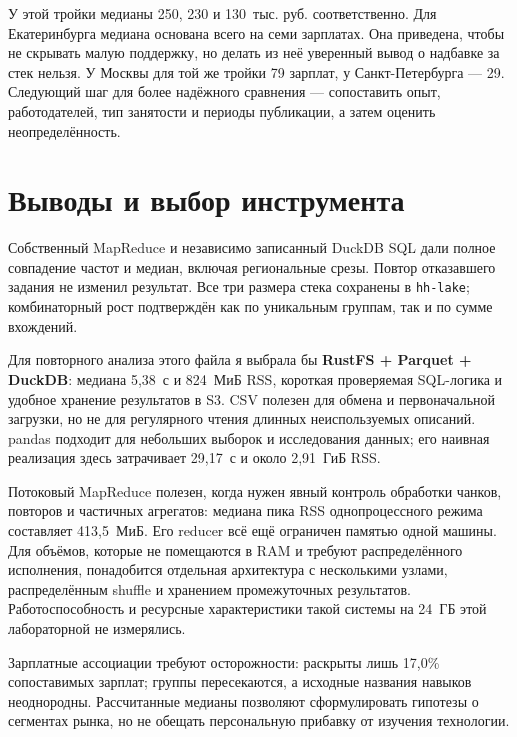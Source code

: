 \documentclass[11pt,a4paper]{article}
\begin{document}
У этой тройки медианы 250, 230 и 130~тыс. руб. соответственно. Для Екатеринбурга медиана основана всего на семи зарплатах. Она приведена, чтобы не скрывать малую поддержку, но делать из неё уверенный вывод о надбавке за стек нельзя. У Москвы для той же тройки 79 зарплат, у Санкт-Петербурга --- 29. Следующий шаг для более надёжного сравнения --- сопоставить опыт, работодателей, тип занятости и периоды публикации, а затем оценить неопределённость.

\section{Выводы и выбор инструмента}
Собственный MapReduce и независимо записанный DuckDB SQL дали полное совпадение частот и медиан, включая региональные срезы. Повтор отказавшего задания не изменил результат. Все три размера стека сохранены в \texttt{hh-lake}; комбинаторный рост подтверждён как по уникальным группам, так и по сумме вхождений.

Для повторного анализа этого файла я выбрала бы \textbf{RustFS + Parquet + DuckDB}: медиана 5,38~с и 824~МиБ RSS, короткая проверяемая SQL-логика и удобное хранение результатов в S3. CSV полезен для обмена и первоначальной загрузки, но не для регулярного чтения длинных неиспользуемых описаний. pandas подходит для небольших выборок и исследования данных; его наивная реализация здесь затрачивает 29,17~с и около 2,91~ГиБ RSS.

Потоковый MapReduce полезен, когда нужен явный контроль обработки чанков, повторов и частичных агрегатов: медиана пика RSS однопроцессного режима составляет 413,5~МиБ. Его reducer всё ещё ограничен памятью одной машины. Для объёмов, которые не помещаются в RAM и требуют распределённого исполнения, понадобится отдельная архитектура с несколькими узлами, распределённым shuffle и хранением промежуточных результатов. Работоспособность и ресурсные характеристики такой системы на 24~ГБ этой лабораторной не измерялись.

Зарплатные ассоциации требуют осторожности: раскрыты лишь 17,0\% сопоставимых зарплат; группы пересекаются, а исходные названия навыков неоднородны. Рассчитанные медианы позволяют сформулировать гипотезы о сегментах рынка, но не обещать персональную прибавку от изучения технологии.

\clearpage
\end{document}
